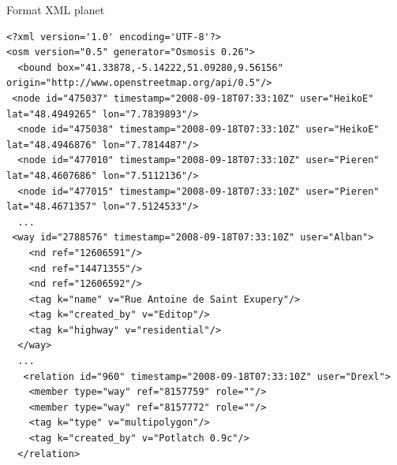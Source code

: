 {
}



\begin{frame}[fragile]{Format XML planet}
\tiny
\begin{verbatim}
<?xml version='1.0' encoding='UTF-8'?>
<osm version="0.5" generator="Osmosis 0.26">
  <bound box="41.33878,-5.14222,51.09280,9.56156" origin="http://www.openstreetmap.org/api/0.5"/>
 <node id="475037" timestamp="2008-09-18T07:33:10Z" user="HeikoE" lat="48.4949265" lon="7.7839893"/>
  <node id="475038" timestamp="2008-09-18T07:33:10Z" user="HeikoE" lat="48.4946876" lon="7.7814487"/>
  <node id="477010" timestamp="2008-09-18T07:33:10Z" user="Pieren" lat="48.4607686" lon="7.5112136"/>
  <node id="477015" timestamp="2008-09-18T07:33:10Z" user="Pieren" lat="48.4671357" lon="7.5124533"/>
  ...
 <way id="2788576" timestamp="2008-09-18T07:33:10Z" user="Alban">
    <nd ref="12606591"/>
    <nd ref="14471355"/>
    <nd ref="12606592"/>
    <tag k="name" v="Rue Antoine de Saint Exupery"/>
    <tag k="created_by" v="Editop"/>
    <tag k="highway" v="residential"/>
  </way>
  ...
   <relation id="960" timestamp="2008-09-18T07:33:10Z" user="Drexl">
    <member type="way" ref="8157759" role=""/>
    <member type="way" ref="8157772" role=""/>
    <tag k="type" v="multipolygon"/>
    <tag k="created_by" v="Potlatch 0.9c"/>
  </relation>
\end{verbatim}
\end{frame}



